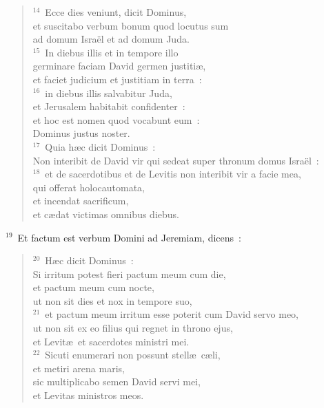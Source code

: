 \begin{flushleft}\begin{verse}${}^{14}$~Ecce dies veniunt, dicit Dominus,\\ et suscitabo verbum bonum quod locutus sum\\ ad domum Isra\"el et ad domum Juda.\\
${}^{15}$~In diebus illis et in tempore illo\\ germinare faciam David germen justiti\ae ,\\ et faciet judicium et justitiam in terra~:\\
${}^{16}$~in diebus illis salvabitur Juda,\\ et Jerusalem habitabit confidenter~:\\ et hoc est nomen quod vocabunt eum~:\\ Dominus justus noster.\\
${}^{17}$~Quia h\ae c dicit Dominus~:\\ Non interibit de David vir qui sedeat super thronum domus Isra\"el~:\\
${}^{18}$~et de sacerdotibus et de Levitis non interibit vir a facie mea,\\ qui offerat holocautomata,\\ et incendat sacrificum,\\ et c\ae dat victimas omnibus diebus.\end{verse}\end{flushleft}


${}^{19}$~Et factum est verbum Domini ad Jeremiam, dicens~:
\begin{flushleft}\begin{verse}${}^{20}$~H\ae c dicit Dominus~:\\ Si irritum potest fieri pactum meum cum die,\\ et pactum meum cum nocte,\\ ut non sit dies et nox in tempore suo,\\
${}^{21}$~et pactum meum irritum esse poterit cum David servo meo,\\ ut non sit ex eo filius qui regnet in throno ejus,\\ et Levit\ae\ et sacerdotes ministri mei.\\
${}^{22}$~Sicuti enumerari non possunt stell\ae\ c\ae li,\\ et metiri arena maris,\\ sic multiplicabo semen David servi mei,\\ et Levitas ministros meos.\end{verse}\end{flushleft}


